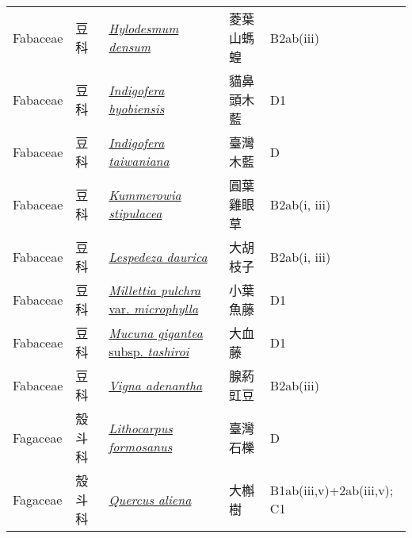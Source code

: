 {\begin{longtable}{p{2.5cm}p{2cm}p{5cm}p{2.5cm}p{3cm}}
    Fabaceae & 豆科 & \href{http://www.theplantlist.org/tpl1.1/search?q=Hylodesmum+densum}{\textit{Hylodesmum densum} } & 菱葉山螞蝗 & B2ab(iii) \index{Hylodesmum@\textit{Hylodesmum}!densum@\textit{densum}}  \index{菱葉山螞蝗} \\
    Fabaceae & 豆科 & \href{http://www.theplantlist.org/tpl1.1/search?q=Indigofera+byobiensis}{\textit{Indigofera byobiensis} } & 貓鼻頭木藍 & D1 \index{Indigofera@\textit{Indigofera}!byobiensis@\textit{byobiensis}}  \index{貓鼻頭木藍} \\
    Fabaceae & 豆科 & \href{http://www.theplantlist.org/tpl1.1/search?q=Indigofera+taiwaniana}{\textit{Indigofera taiwaniana} } & 臺灣木藍 & D \index{Indigofera@\textit{Indigofera}!taiwaniana@\textit{taiwaniana}}  \index{臺灣木藍} \\
    Fabaceae & 豆科 & \href{http://www.theplantlist.org/tpl1.1/search?q=Kummerowia+stipulacea}{\textit{Kummerowia stipulacea} } & 圓葉雞眼草 & B2ab(i, iii) \index{Kummerowia@\textit{Kummerowia}!stipulacea@\textit{stipulacea}}  \index{圓葉雞眼草} \\
    Fabaceae & 豆科 & \href{http://www.theplantlist.org/tpl1.1/search?q=Lespedeza+daurica}{\textit{Lespedeza daurica} } & 大胡枝子 & B2ab(i, iii) \index{Lespedeza@\textit{Lespedeza}!daurica@\textit{daurica}}  \index{大胡枝子} \\
    Fabaceae & 豆科 & \href{http://www.theplantlist.org/tpl1.1/search?q=Millettia+pulchra+var.+microphylla}{\textit{Millettia pulchra} var. \textit{microphylla} } & 小葉魚藤 & D1 \index{Millettia@\textit{Millettia}!pulchra@\textit{pulchra}!var. microphylla@var. \textit{microphylla}}  \index{小葉魚藤} \\
    Fabaceae & 豆科 & \href{http://www.theplantlist.org/tpl1.1/search?q=Mucuna+gigantea+subsp.+tashiroi}{\textit{Mucuna gigantea} subsp. \textit{tashiroi} } & 大血藤 & D1 \index{Mucuna@\textit{Mucuna}!gigantea@\textit{gigantea}!subsp. tashiroi@subsp. \textit{tashiroi}}  \index{大血藤} \\
    Fabaceae & 豆科 & \href{http://www.theplantlist.org/tpl1.1/search?q=Vigna+adenantha}{\textit{Vigna adenantha} } & 腺葯豇豆 & B2ab(iii) \index{Vigna@\textit{Vigna}!adenantha@\textit{adenantha}}  \index{腺葯豇豆} \\
    Fagaceae & 殼斗科 & \href{http://www.theplantlist.org/tpl1.1/search?q=Lithocarpus+formosanus}{\textit{Lithocarpus formosanus} } & 臺灣石櫟 & D \index{Lithocarpus@\textit{Lithocarpus}!formosanus@\textit{formosanus}}  \index{臺灣石櫟} \\
    Fagaceae & 殼斗科 & \href{http://www.theplantlist.org/tpl1.1/search?q=Quercus+aliena}{\textit{Quercus aliena} } & 大槲樹 & B1ab(iii,v)+2ab(iii,v); C1 \index{Quercus@\textit{Quercus}!aliena@\textit{aliena}}  \index{大槲樹} \\

\end{longtable}}
